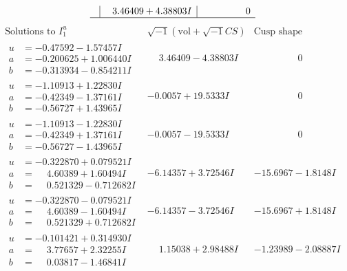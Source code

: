 \documentclass[1p]{elsarticle_modified}
\theoremstyle{definition}
\newcommand{\I}{\sqrt{-1}}
\begin{document}
$$\begin{array}{c|c|c}
 & \phantom{-}3.46409 + 4.38803 I & \phantom{-0.000000 } 0\\
 \hline 
 \end{array}$$\newpage$$\begin{array}{c|c|c}  
\text{Solutions to }I^u_{1}& \I (\text{vol} + \sqrt{-1}CS) & \text{Cusp shape}\\
 \hline 
\begin{aligned}
u &= -0.47592 - 1.57457 I \\
a &= -0.200625 + 1.006440 I \\
b &= -0.313934 - 0.854211 I\end{aligned}
 & \phantom{-}3.46409 - 4.38803 I & \phantom{-0.000000 } 0 \\ \hline\begin{aligned}
u &= -1.10913 + 1.22830 I \\
a &= -0.42349 - 1.37161 I \\
b &= -0.56727 + 1.43965 I\end{aligned}
 & -0.0057 + 19.5333 I & \phantom{-0.000000 } 0 \\ \hline\begin{aligned}
u &= -1.10913 - 1.22830 I \\
a &= -0.42349 + 1.37161 I \\
b &= -0.56727 - 1.43965 I\end{aligned}
 & -0.0057 - 19.5333 I & \phantom{-0.000000 } 0 \\ \hline\begin{aligned}
u &= -0.322870 + 0.079521 I \\
a &= \phantom{-}4.60389 + 1.60494 I \\
b &= \phantom{-}0.521329 - 0.712682 I\end{aligned}
 & -6.14357 + 3.72546 I & -15.6967 - 1.8148 I \\ \hline\begin{aligned}
u &= -0.322870 - 0.079521 I \\
a &= \phantom{-}4.60389 - 1.60494 I \\
b &= \phantom{-}0.521329 + 0.712682 I\end{aligned}
 & -6.14357 - 3.72546 I & -15.6967 + 1.8148 I \\ \hline\begin{aligned}
u &= -0.101421 + 0.314930 I \\
a &= \phantom{-}3.77657 + 2.32255 I \\
b &= \phantom{-}0.03817 - 1.46841 I\end{aligned}
 & \phantom{-}1.15038 + 2.98488 I & -1.23989 - 2.08887 I \\ \hline\begin{aligned}

\end{aligned}
\end{array}$$
\end{document}
